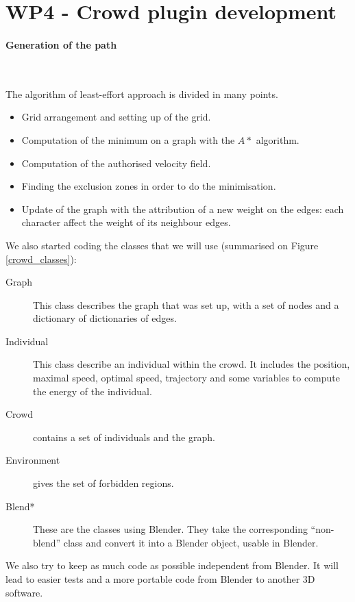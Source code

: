 \section{WP4 - Crowd plugin development}

\paragraph{Generation of the path}~

\noindent The algorithm of least-effort approach is divided in many points.
\begin{itemize}
  \item Grid arrangement and setting up of the grid.
  \item Computation of the minimum on a graph with the $A*$ algorithm.
  \item Computation of the authorised velocity field.
  \item Finding the exclusion zones in order to do the minimisation.
  \item Update of the graph with the attribution of a new weight on the edges: each character affect the weight of its neighbour edges.
\end{itemize}

\noindent We also started coding the classes that we will use (summarised on Figure \ref{crowd_classes}):
\begin{description}
  \item[Graph] This class describes the graph that was set up, with a set of nodes and a dictionary of dictionaries of edges.
  \item[Individual] This class describe an individual within the crowd. It includes the position, maximal speed, optimal speed, trajectory and some variables to compute the energy of the individual.
  \item[Crowd] contains a set of individuals and the graph.
  \item[Environment] gives the set of forbidden regions.
  \item[Blend*] These are the classes using Blender. They take the corresponding ``non-blend'' class and convert it into a Blender object, usable in Blender. 
\end{description}

We also try to keep as much code as possible independent from Blender. It will lead to easier tests and a more portable code from Blender to another 3D software.

